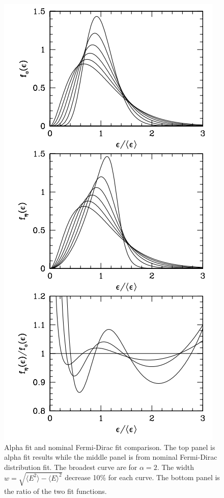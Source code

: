 \documentclass[%
 aip,
 jmp,%
 amsmath,amssymb,
 reprint,%
]{revtex4-1}
\begin{document}
\begin{figure}
\centering
\includegraphics[width=\columnwidth]{assets/neutrino_spectra_sn_simulations.png}
\caption{Alpha fit and nominal Fermi-Dirac fit comparison. The top panel is alpha fit results while the middle panel is from nominal Fermi-Dirac distribution fit. The broadest curve are for $\alpha=2$. The width $w=\sqrt{\langle E^2 \rangle - \langle E\rangle^2}$ decrease 10\% for each curve. The bottom panel is the ratio of the two fit functions.}
\label{fig:neutrino_spectra_sn_simulations}
\end{figure}
\end{document}
